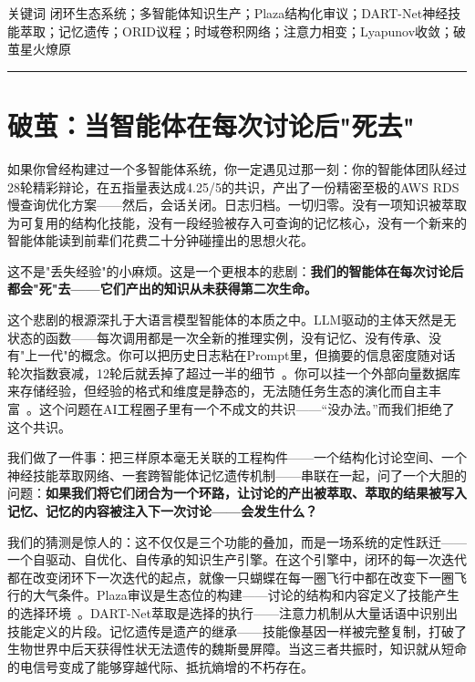 \documentclass[twocolumn,10.5pt]{ctexart}
\begin{document}
\vspace{6pt}
{\heiti 关键词 \quad}{\kaishu 闭环生态系统；多智能体知识生产；Plaza结构化审议；DART-Net神经技能萃取；记忆遗传；ORID议程；时域卷积网络；注意力相变；Lyapunov收敛；破茧星火燎原}

\vspace{12pt}
\hrule
\vspace{12pt}

\section{破茧：当智能体在每次讨论后"死去"}

如果你曾经构建过一个多智能体系统，你一定遇见过那一刻：你的智能体团队经过28轮精彩辩论，在五指量表达成4.25/5的共识，产出了一份精密至极的AWS RDS慢查询优化方案——然后，会话关闭。日志归档。一切归零。没有一项知识被萃取为可复用的结构化技能，没有一段经验被存入可查询的记忆核心，没有一个新来的智能体能读到前辈们花费二十分钟碰撞出的思想火花。

这不是"丢失经验"的小麻烦。这是一个更根本的悲剧：\textbf{我们的智能体在每次讨论后都会"死"去——它们产出的知识从未获得第二次生命。}

这个悲剧的根源深扎于大语言模型智能体的本质之中。LLM驱动的主体天然是无状态的函数——每次调用都是一次全新的推理实例，没有记忆、没有传承、没有"上一代"的概念。你可以把历史日志粘在Prompt里，但摘要的信息密度随对话轮次指数衰减，12轮后就丢掉了超过一半的细节~\cite{wang2023voyager}。你可以挂一个外部向量数据库来存储经验，但经验的格式和维度是静态的，无法随任务生态的演化而自主丰富~\cite{park2023generative}。这个问题在AI工程圈子里有一个不成文的共识——“没办法。”而我们拒绝了这个共识。

我们做了一件事：把三样原本毫无关联的工程构件——一个结构化讨论空间、一个神经技能萃取网络、一套跨智能体记忆遗传机制——串联在一起，问了一个大胆的问题：\textbf{如果我们将它们闭合为一个环路，让讨论的产出被萃取、萃取的结果被写入记忆、记忆的内容被注入下一次讨论——会发生什么？}

我们的猜测是惊人的：这不仅仅是三个功能的叠加，而是一场系统的定性跃迁——一个自驱动、自优化、自传承的知识生产引擎。在这个引擎中，闭环的每一次迭代都在改变闭环下一次迭代的起点，就像一只蝴蝶在每一圈飞行中都在改变下一圈飞行的大气条件。Plaza审议是生态位的构建——讨论的结构和内容定义了技能产生的选择环境~\cite{odling2003niche,laland2015extended}。DART-Net萃取是选择的执行——注意力机制从大量话语中识别出技能定义的片段。记忆遗传是遗产的继承——技能像基因一样被完整复制，打破了生物世界中后天获得性状无法遗传的魏斯曼屏障。当这三者共振时，知识就从短命的电信号变成了能够穿越代际、抵抗熵增的不朽存在。
\end{document}
